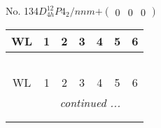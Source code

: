 \documentclass[fleqn,9pt,landscape]{jsarticle}
\begin{document}
\newpage
No. 134\quad$D_{4h}^{12}$\quad$P4_2/nnm$\quad[ tetragonal ]\quad$+\begin{pmatrix} 0 & 0 & 0 \end{pmatrix}$
\begin{center}
\renewcommand{\arraystretch}{1.2}
\begin{longtable}{ccccccc}
 \hline \hline
WL & 1 & 2 & 3 & 4 & 5 & 6 \\ \hline \endfirsthead

\multicolumn{6}{l}{\tablename\ \thetable{}} \\
 \hline \hline
WL & 1 & 2 & 3 & 4 & 5 & 6 \\ \hline \endhead

 \hline \hline
\multicolumn{6}{r}{\footnotesize\it continued ...} \\ \endfoot

 \hline \hline
\multicolumn{6}{r}{} \\ \endlastfoot


\end{longtable}
\end{center}
\end{document}
